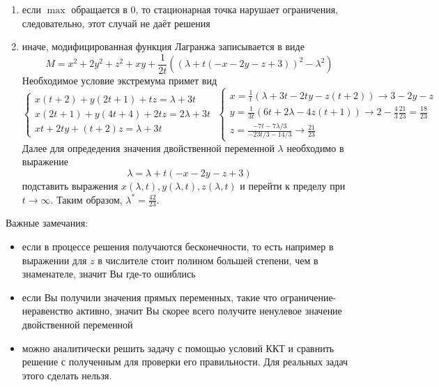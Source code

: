 \documentclass[12pt]{article}
\begin{document}
\begin{enumerate}
\begin{itemize}
\begin{enumerate}
\item если $\max$ обращается в 0, то стационарная точка нарушает ограничения, следовательно, этот случай не даёт решения
\item иначе, модифицированная функция Лагранжа записывается в виде
\[
M = x^2 + 2y^2 + z^2 + xy + \frac{1}{2t}\left((\lambda + t(-x-2y-z + 3))^2 - \lambda^2 \right)
\] 
Необходимое условие экстремума примет вид
\[
\begin{cases}
x(t+2) + y(2t + 1) + tz = \lambda + 3t\\
x(2t + 1) + y (4t + 4) + 2tz = 2\lambda + 3t\\
xt + 2ty + (t + 2)z = \lambda + 3t
\end{cases}
\;
\begin{cases}
x = \frac{1}{t}\left( \lambda + 3t - 2ty - z(t+2) \right) \to 3 - 2y - z\\
y = \frac{1}{3t}(6t + 2\lambda - 4z(t + 1)) \to 2 - \frac{4}{3}\frac{21}{23} = \frac{18}{23}\\
z = \frac{-7t - 7\lambda/3 }{-23t/3 - 14/3} \to \frac{21}{23}
\end{cases}
\]
Далее для опредедения значения двойственной переменной $\lambda$ необходимо в выражение
\[
\lambda = \lambda + t (-x - 2y - z + 3)
\]
подставить выражения $x(\lambda, t), y(\lambda, t), z(\lambda, t)$ и перейти к пределу при $t \to \infty$.
Таким образом, $\lambda^* = \frac{42}{23}$.
\end{enumerate}
Важные замечания:
\begin{itemize}
\item если в процессе решения получаются бесконечности, то есть например в выражении для $z$ в числителе стоит полином большей степени, чем в знаменателе, значит Вы где-то ошиблись
\item если Вы получили значения прямых переменных, такие что ограничение-неравенство активно, значит Вы скорее всего получите ненулевое значение двойственной переменной
\item можно аналитически решить задачу с помощью условий ККТ и сравнить решение с полученным для проверки его правильности.
Для реальных задач этого сделать нельзя.
\end{itemize}
\end{itemize}
\end{enumerate}
\end{document}

